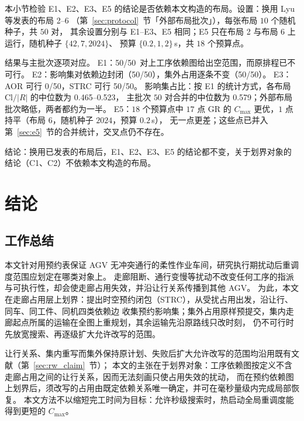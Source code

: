 \documentclass[manuscript,screen,review]{acmart}
\providecommand{\STRC}{\textsc{STRC}}
\newcommand{\NSeeds}{10}
\newcommand{\NPairs}{50}
\newcommand{\EoneFracMed}{0.579}    %
\newcommand{\NPubPairs}{50}
\newcommand{\PubPassMiss}{\NPubPairs/\NPubPairs}
\newcommand{\PubFeasRone}{0/\NPubPairs}
\newcommand{\PubFeasRtwo}{\NPubPairs/\NPubPairs}
\newcommand{\PubPassClosed}{\NPubPairs/\NPubPairs}
\newcommand{\PubPassInvar}{\NPubPairs/\NPubPairs}
\newcommand{\PubEoneFracLo}{0.465}
\newcommand{\PubEoneFracHi}{0.523}
\begin{document}
本小节检验 E1、E2、E3、E5 的结论是否依赖本文构造的布局。设置：换用 Lyu 等发表的布局 2--6
（第~\ref{sec:protocol}~节「外部布局批次」），每张布局 \(\NSeeds\) 个随机种子，共 \(\NPubPairs\) 对，
其余设置分别与 E1--E3、E5 相同；E5 只在布局 2 与布局 6 上运行，随机种子 \(\{42,7,2024\}\)、
预算 \(\{0.2,1,2\}\)\,s，共 \(18\) 个预算点。

结果与主批次逐项对应。
E1：\PubPassMiss\ 对上工序依赖图给出空范围，而原排程已不可行。
E2：影响集对依赖边封闭（\PubPassClosed），集外占用逐条不变（\PubPassInvar）。
E3：AOR 可行 \PubFeasRone，\STRC{} 可行 \PubFeasRtwo。
影响集占比：按 E1 的统计方式，各布局 \(\mathrm{Cl}/|R|\) 的中位数为 \PubEoneFracLo--\PubEoneFracHi，
主批次 \(\NPairs\) 对合并的中位数为 \EoneFracMed；外部布局批次略低，两者都约为一半。
E5：\(18\) 个预算点中 \(17\) 点 GR 的 \(C_{\max}\) 更优，\(1\) 点持平（布局 6，随机种子 \(2024\)，预算 \(0.2\)\,s），
无一点更差；这些点已并入第~\ref{sec:e5}~节的合并统计，交叉点仍不存在。

结论：换用已发表的布局后，E1、E2、E3、E5 的结论都不变，关于划界对象的结论（C1、C2）不依赖本文构造的布局。

\section{结论}
\label{sec:conclusion}

\subsection{工作总结}

本文针对用预约表保证 AGV 无冲突通行的柔性作业车间，研究执行期扰动后重调度范围应划定在哪类对象上。
走廊阻断、通行变慢等扰动不改变任何工序的指派与可执行性，却会使走廊占用失效，并沿让行关系传播到其他 AGV。
为此，本文在走廊占用层上划界：提出时空预约闭包（\STRC{}），从受扰占用出发，沿让行、同车、同工件、同机四类依赖边
收集预约影响集；集外占用原样预提交，集内走廊起点所属的运输在全图上重规划，其余运输先沿原路线只改时刻，
仍不可行时先放宽搜索、再逐级扩大允许改写的范围。

让行关系、集内重写而集外保持原计划、失败后扩大允许改写的范围均沿用既有文献（第~\ref{sec:rw_claim}~节）；
本文的主张在于划界对象：工序依赖图按定义不含走廊占用之间的让行关系，因而无法刻画只使占用失效的扰动，
而在预约依赖图上划界后，须改写的占用由既定依赖关系唯一确定，并可在毫秒量级内完成局部恢复。
本文方法不以缩短完工时间为目标：允许秒级搜索时，热启动全局重调度能得到更短的 \(C_{\max}\)。
\end{document}
